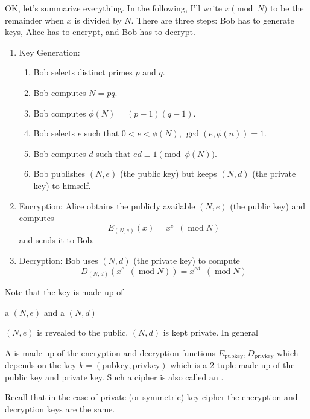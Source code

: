 OK, let's summarize everything.
In the following, I'll write $x \pmod{N}$ to be the remainder when $x$
is divided by $N$.
There are three steps: Bob has to
generate keys, Alice has to encrypt, and Bob has to decrypt.
\begin{enumerate}[nosep]
 \item Key Generation:
  \begin{enumerate}
   \item Bob selects distinct primes $p$ and $q$.
   \item Bob computes $N = pq$.
   \item Bob computes $\phi(N) = (p-1)(q-1)$.
   \item Bob selects $e$ such that $0 < e < \phi(N)$,
   $\gcd(e, \phi(n)) = 1$.
   \item Bob computes $d$ such that
     $ed \equiv 1 \pmod{\phi(N)}$.
 \item Bob publishes $(N,e)$ (the public key) but keeps $(N,d)$
   (the private key) to himself.
  \end{enumerate}
 \item Encryption:
   Alice obtains the publicly available $(N,e)$ (the public key) and
   computes
  \[
   E_{(N,e)}(x) = x^e \,\,\,(\operatorname{mod} N)
  \]
  and sends it to Bob.
 \item Decryption: Bob uses $(N,d)$ (the private key) to compute
 \[
  D_{(N,d)}( x^e \,\,\,(\operatorname{mod} N) ) = x^{ed} \,\,\,(\operatorname{mod} N)
 \]
\end{enumerate}

Note that the key is made up of
\begin{enumerate}[nosep]
  \li a  $(N,e)$ and
  \li a  $(N,d)$
\end{enumerate}
$(N,e)$ is revealed to the public.
$(N,d)$ is kept private.
In general

\begin{defn}
  A  is made up of the encryption
  and decryption functions
  $E_{\text{pubkey}}, D_{\text{privkey}}$ which depends on
  the key
  $k = (\text{pubkey}, \text{privkey})$
  which is a 2-tuple made up of
  the public key and private key.
  Such a cipher is also called an
  .
\end{defn}

Recall that in the case of private (or symmetric) key cipher
the encryption and decryption keys are the same. 



